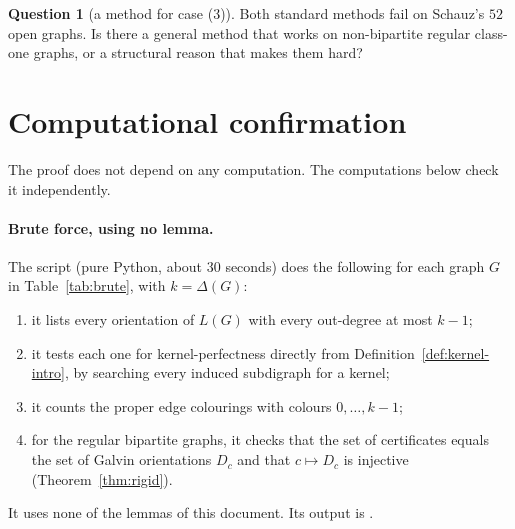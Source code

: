 \documentclass[11pt]{article}
\theoremstyle{plain}
\theoremstyle{definition}
\newtheorem{question}[theorem]{Question}
\theoremstyle{remark}
\newcommand{\LG}{L(G)}
\begin{document}
\begin{question}[a method for case (3)]
Both standard methods fail on Schauz's $52$ open graphs. Is there a general method that works on
non-bipartite regular class-one graphs, or a structural reason that makes them hard?
\end{question}

\section{Computational confirmation}\label{sec:computation}

The proof does not depend on any computation. The computations below check it independently.

\paragraph{Brute force, using no lemma.} The script
 (pure Python, about $30$ seconds) does the
following for each graph $G$ in Table~\ref{tab:brute}, with $k=\Delta(G)$:
\begin{enumerate}[label=(\arabic*)]
  \item it lists every orientation of $\LG$ with every out-degree at most $k-1$;
  \item it tests each one for kernel-perfectness directly from Definition~\ref{def:kernel-intro},
    by searching every induced subdigraph for a kernel;
  \item it counts the proper edge colourings with colours $0,\dots,k-1$;
  \item for the regular bipartite graphs, it checks that the set of certificates equals the set
    of Galvin orientations $D_c$ and that $c\mapsto D_c$ is injective (Theorem~\ref{thm:rigid}).
\end{enumerate}
It uses none of the lemmas of this document. Its output is
.
\end{document}
